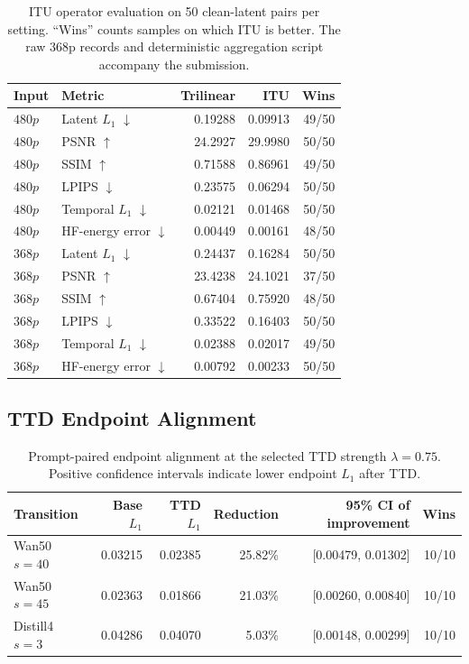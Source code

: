 \documentclass[letterpaper]{article}
\begin{document}
\begin{table}[H]
  \centering
  \scriptsize
  \setlength{\tabcolsep}{3.2pt}
  \begin{tabular}{llrrr}
    \toprule
    Input & Metric & Trilinear & ITU & Wins \\
    \midrule
    \(480p\) & Latent \(L_1\) \(\downarrow\) & 0.19288 & 0.09913 & 49/50 \\
    \(480p\) & PSNR \(\uparrow\) & 24.2927 & 29.9980 & 50/50 \\
    \(480p\) & SSIM \(\uparrow\) & 0.71588 & 0.86961 & 49/50 \\
    \(480p\) & LPIPS \(\downarrow\) & 0.23575 & 0.06294 & 50/50 \\
    \(480p\) & Temporal \(L_1\) \(\downarrow\) & 0.02121 & 0.01468 & 50/50 \\
    \(480p\) & HF-energy error \(\downarrow\) & 0.00449 & 0.00161 & 48/50 \\
    \midrule
    \(368p\) & Latent \(L_1\) \(\downarrow\) & 0.24437 & 0.16284 & 50/50 \\
    \(368p\) & PSNR \(\uparrow\) & 23.4238 & 24.1021 & 37/50 \\
    \(368p\) & SSIM \(\uparrow\) & 0.67404 & 0.75920 & 48/50 \\
    \(368p\) & LPIPS \(\downarrow\) & 0.33522 & 0.16403 & 50/50 \\
    \(368p\) & Temporal \(L_1\) \(\downarrow\) & 0.02388 & 0.02017 & 49/50 \\
    \(368p\) & HF-energy error \(\downarrow\) & 0.00792 & 0.00233 & 50/50 \\
    \bottomrule
  \end{tabular}
  \caption{ITU operator evaluation on 50 clean-latent pairs per setting.
  ``Wins'' counts samples on which ITU is better.  The raw 368p records and
  deterministic aggregation script accompany the submission.}
  \label{tab:itu-operator}
\end{table}

\subsection{TTD Endpoint Alignment}

\begin{table}[H]
  \centering
  \small
  \setlength{\tabcolsep}{4pt}
  \begin{tabular}{lrrrrr}
    \toprule
    Transition & Base \(L_1\) & TTD \(L_1\) & Reduction &
    95\% CI of improvement & Wins \\
    \midrule
    Wan50 \(s=40\) & 0.03215 & 0.02385 & 25.82\% &
    [0.00479, 0.01302] & 10/10 \\
    Wan50 \(s=45\) & 0.02363 & 0.01866 & 21.03\% &
    [0.00260, 0.00840] & 10/10 \\
    Distill4 \(s=3\) & 0.04286 & 0.04070 & 5.03\% &
    [0.00148, 0.00299] & 10/10 \\
    \bottomrule
  \end{tabular}
  \caption{Prompt-paired endpoint alignment at the selected TTD strength
  \(\lambda=0.75\).  Positive confidence intervals indicate lower endpoint
  \(L_1\) after TTD.}
  \label{tab:ttd-endpoint}
\end{table}
\end{document}
